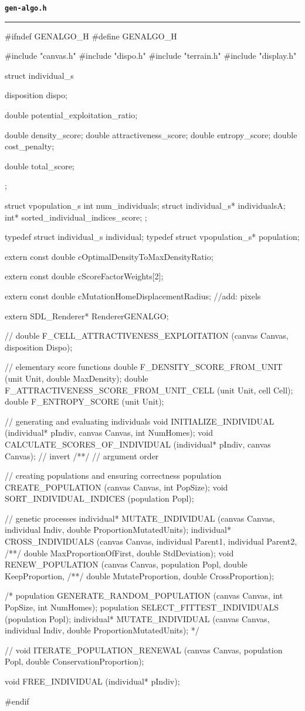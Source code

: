\vspace*{5mm}
{\Large \texttt{\textbf{gen-algo.h}}}
\vspace*{1mm}
\hrule
\begin{C}
#ifndef GENALGO_H
#define GENALGO_H

#include "canvas.h"
#include "dispo.h"
#include "terrain.h"
#include "display.h"


struct individual_s {
	disposition dispo;
	
	double potential_exploitation_ratio;
	
	double density_score;
	double attractiveness_score;
	double entropy_score;
	double cost_penalty;
	
	double total_score;
};

struct vpopulation_s {
	int num_individuals;
	struct individual_s* individualsA;
	int* sorted_individual_indices_score;
};


typedef struct individual_s individual;
typedef struct vpopulation_s* population;


extern const double cOptimalDensityToMaxDensityRatio;

extern const double cScoreFactorWeights[2];

extern const double cMutationHomeDisplacementRadius; //add: pixels

extern SDL_Renderer* RendererGENALGO;

// double F_CELL_ATTRACTIVENESS_EXPLOITATION (canvas Canvas, disposition Dispo);

// elementary score functions
double F_DENSITY_SCORE_FROM_UNIT (unit Unit, double MaxDensity);
double F_ATTRACTIVENESS_SCORE_FROM_UNIT_CELL (unit Unit, cell Cell);
double F_ENTROPY_SCORE (unit Unit);

// generating and evaluating individuals
void INITIALIZE_INDIVIDUAL (individual* pIndiv, canvas Canvas, int NumHomes);
void CALCULATE_SCORES_OF_INDIVIDUAL (individual* pIndiv, canvas Canvas); // invert
/**/ // argument order

// creating populations and ensuring correctness
population CREATE_POPULATION (canvas Canvas, int PopSize);
void SORT_INDIVIDUAL_INDICES (population Popl);

// genetic processes
individual* MUTATE_INDIVIDUAL (canvas Canvas, individual Indiv, double ProportionMutatedUnits);
individual* CROSS_INDIVIDUALS (canvas Canvas, individual Parent1, individual Parent2,
/**/ double MaxProportionOfFirst, double StdDeviation);
void RENEW_POPULATION (canvas Canvas, population Popl, double KeepProportion,
/**/ double MutateProportion, double CrossProportion);

/* population GENERATE_RANDOM_POPULATION (canvas Canvas, int PopSize, int NumHomes);
population SELECT_FITTEST_INDIVIDUALS (population Popl);
individual* MUTATE_INDIVIDUAL (canvas Canvas, individual Indiv, double ProportionMutatedUnits); */

// void ITERATE_POPULATION_RENEWAL (canvas Canvas, population Popl, double ConservationProportion);



void FREE_INDIVIDUAL (individual* pIndiv);

#endif
\end{C}
